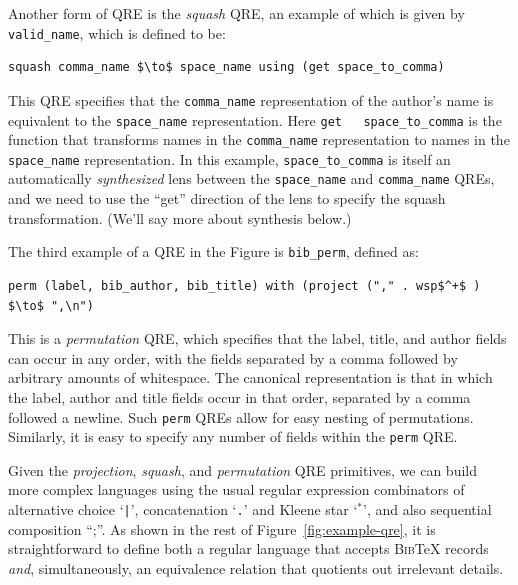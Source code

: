 \documentclass{svproc}
\newcommand{\cd}[1]{\lstinline[backgroundcolor=\color{white}]$#1$}
\newcommand{\bibtex}{\textsc{Bib}\TeX{}}
\begin{document}
Another form of QRE is the \textit{squash} QRE, an example of which is given by
\cd{valid_name}, which is defined to be:

\begin{center}
\begin{lstlisting}
squash comma_name $\to$ space_name using (get space_to_comma)
\end{lstlisting}
\end{center}

\noindent This QRE specifies that the \cd{comma_name} representation of the
author's name is equivalent to the \cd{space_name} representation.  Here \cd{get
  space_to_comma} is the function that transforms names in the \cd{comma_name}
representation to names in the \cd{space_name} representation.  In this
  example, \cd{space_to_comma} is itself an automatically \textit{synthesized}
  lens between the \cd{space_name} and \cd{comma_name} QREs, and we need to use
  the ``get'' direction of the lens to specify the squash transformation. (We'll
  say more about synthesis below.)

The third example of a QRE in the Figure is \cd{bib_perm}, defined as:
\begin{center}
\begin{lstlisting}
perm (label, bib_author, bib_title) with (project ("," . wsp$^+$ ) $\to$ ",\n")
\end{lstlisting}
\end{center}

\noindent This is a \textit{permutation} QRE, which specifies that the label,
title, and author fields can occur in any order, with the fields separated by a
comma followed by arbitrary amounts of whitespace. The canonical representation
is that in which the label, author and title fields occur in that order,
separated by a comma followed a newline.
Such \cd{perm} QREs allow for easy nesting of permutations. Similarly, it is easy
to specify any number of fields within the \cd{perm} QRE.

Given the \textit{projection}, \textit{squash}, and \textit{permutation}
  QRE primitives, we can build more complex languages using the usual regular
  expression combinators of alternative choice `\cd{|}', concatenation `\cd{.}'
  and Kleene star `$^*$', and also sequential composition ``;''.  As shown in
  the rest of Figure~\ref{fig:example-qre}, it is straightforward to define both a
  regular language that accepts \bibtex{} records \textit{and}, simultaneously,
  an equivalence relation that quotients out irrelevant details.
\end{document}
